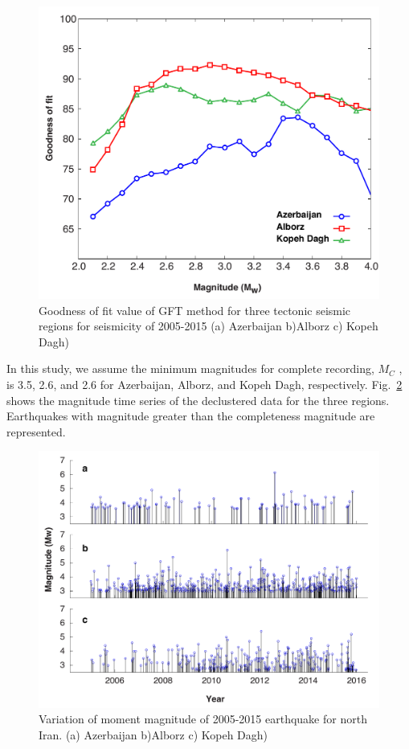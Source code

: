 \begin{figure} [ht]
\centering
\includegraphics[scale=0.4]{figures/pdf/Figure03.pdf} 
\caption{Goodness of fit value of GFT method for three tectonic seismic regions for seismicity of 2005-2015 (a) Azerbaijan b)Alborz c) Kopeh Dagh)}
\label{fig:completeness}
\end{figure} 
   

In this study, we assume the minimum magnitudes for complete recording,  $M_C$ , is 3.5, 2.6, and 2.6 for Azerbaijan, Alborz, and Kopeh Dagh, respectively. Fig.~\ref{fig:mag-time}  shows the magnitude time series of the declustered data for the three regions. Earthquakes with magnitude greater than the completeness magnitude are represented. 

\begin{figure} [ht]
\centering
\includegraphics[scale=0.5]{figures/pdf/Figure04.pdf} 
\caption{Variation of moment magnitude of 2005-2015 earthquake for north Iran. (a) Azerbaijan b)Alborz c) Kopeh Dagh)}
\label{fig:mag-time}
\end{figure} 

